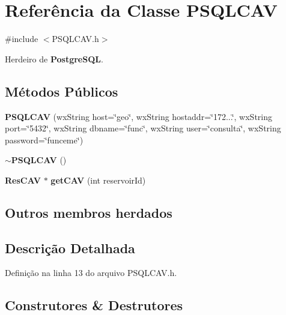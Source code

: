 \section{Referência da Classe P\+S\+Q\+L\+C\+AV}
\label{class_p_s_q_l_c_a_v}


{\ttfamily \#include $<$P\+S\+Q\+L\+C\+A\+V.\+h$>$}



Herdeiro de {\bf Postgre\+S\+QL}.

\subsection*{Métodos Públicos}
\begin{DoxyCompactItemize}
\item 
{\bf P\+S\+Q\+L\+C\+AV} (wx\+String host=\char`\"{}geo\char`\"{}, wx\+String hostaddr=\char`\"{}172...\char`\"{}, wx\+String port=\char`\"{}5432\char`\"{}, wx\+String dbname=\char`\"{}func\char`\"{}, wx\+String user=\char`\"{}consulta\char`\"{}, wx\+String password=\char`\"{}funceme\char`\"{})
\item 
{\bf $\sim$\+P\+S\+Q\+L\+C\+AV} ()
\item 
{\bf Res\+C\+AV} $\ast$ {\bf get\+C\+AV} (int reservoir\+Id)
\end{DoxyCompactItemize}
\subsection*{Outros membros herdados}


\subsection{Descrição Detalhada}


Definição na linha 13 do arquivo P\+S\+Q\+L\+C\+A\+V.\+h.



\subsection{Construtores \& Destrutores}
